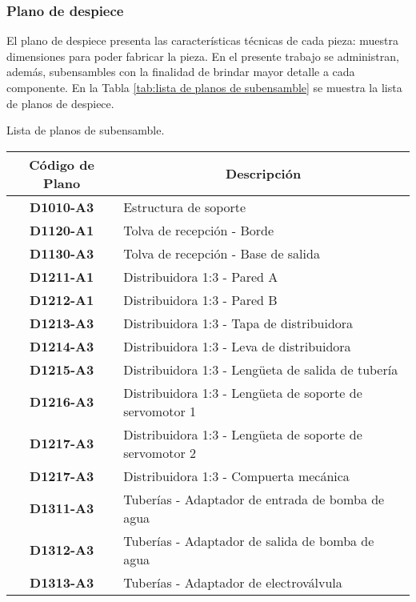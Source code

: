 \subsubsection{Plano de despiece}

El plano de despiece presenta las características técnicas de cada pieza: muestra dimensiones para poder fabricar la pieza. En el presente trabajo se administran, además, subensambles con la finalidad de brindar mayor detalle a cada componente. En la Tabla \ref{tab:lista de planos de subensamble} se muestra la lista de planos de despiece. 

\begin{mytable}[H]
	\footnotesize\centering
	\caption{Lista de planos de subensamble.}
	\label{tab:lista de planos de subensamble}
	\begin{tabular}{|c|l|}
		\hline
		\multicolumn{1}{|c|}{\textbf{Código de Plano}} & \multicolumn{1}{c|}{\textbf{Descripción}} \\ \hline
		\textbf{D1010-A3}         & Estructura de soporte  \\ \hline
		\textbf{D1120-A1}         & Tolva de recepción - Borde \\ \hline
		\textbf{D1130-A3}         & Tolva de recepción - Base de salida \\ \hline
		\textbf{D1211-A1}         & Distribuidora 1:3 - Pared A \\ \hline
		\textbf{D1212-A1}         & Distribuidora 1:3 - Pared B \\ \hline
		\textbf{D1213-A3}         & Distribuidora 1:3 - Tapa de distribuidora \\ \hline
		\textbf{D1214-A3}         & Distribuidora 1:3 - Leva de distribuidora \\ \hline
		\textbf{D1215-A3}         & Distribuidora 1:3 - Lengüeta de salida de tubería \\ \hline
		\textbf{D1216-A3}         & Distribuidora 1:3 - Lengüeta de soporte de servomotor 1 \\ \hline
		\textbf{D1217-A3}         & Distribuidora 1:3 - Lengüeta de soporte de servomotor 2 \\ \hline 
		\textbf{D1217-A3}         & Distribuidora 1:3 - Compuerta mecánica \\ \hline 
		\textbf{D1311-A3}         & Tuberías - Adaptador de entrada de bomba de agua \\ \hline 
		\textbf{D1312-A3}         & Tuberías - Adaptador de salida de bomba de agua \\ \hline 
		\textbf{D1313-A3}         & Tuberías - Adaptador de electroválvula\\ \hline

\end{tabular}
\end{mytable}
